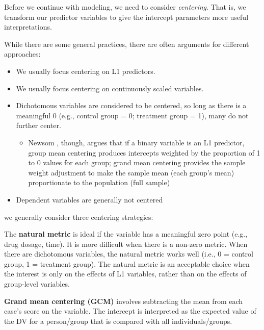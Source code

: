 \documentclass[
  english,
]{book}
\providecommand{\tightlist}{%
  \setlength{\itemsep}{0pt}\setlength{\parskip}{0pt}}
\begin{document}
Before we continue with modeling, we need to consider \emph{centering}. That is, we transform our predictor variables to give the intercept parameters more useful interpretations.

While there are some general practices, there are often arguments for different approaches:

\begin{itemize}
\tightlist
\item
  We usually focus centering on L1 predictors.
\item
  We usually focus centering on continuously scaled variables.
\item
  Dichotomous variables are considered to be centered, so long as there is a meaningful 0 (e.g., control group = 0; treatment group = 1), many do not further center.

  \begin{itemize}
  \tightlist
  \item
    Newsom \citeyearpar{newsom_centering_2019}, though, argues that if a binary variable is an L1 predictor, group mean centering produces intercepts weighted by the proportion of 1 to 0 values for each group; grand mean centering provides the sample weight adjustment to make the sample mean (each group's mean) proportionate to the population (full sample)
  \end{itemize}
\item
  Dependent variables are generally not centered
\end{itemize}

we generally consider three centering strategies:

The \textbf{natural metric} is ideal if the variable has a meaningful zero point (e.g., drug dosage, time). It is more difficult when there is a non-zero metric. When there are dichotomous variables, the natural metric works well (i.e., 0 = control group, 1 = treatment group). The natural metric is an acceptable choice when the interest is only on the effects of L1 variables, rather than on the effects of group-level variables.

\textbf{Grand mean centering (GCM)} involves subtracting the mean from each case's score on the variable. The intercept is interpreted as the expected value of the DV for a person/group that is compared with all individuals/groups.
\end{document}
